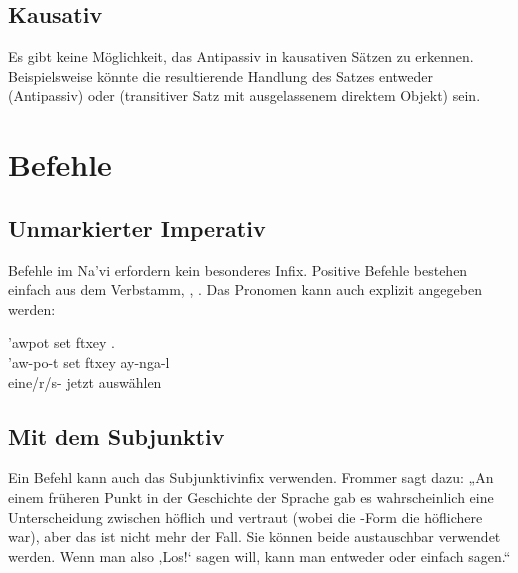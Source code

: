 \subsection{Kausativ} Es gibt keine Möglichkeit, das Antipassiv in kausativen Sätzen zu erkennen. Beispielsweise könnte die resultierende Handlung des Satzes   entweder   (Antipassiv) oder   (transitiver Satz mit ausgelassenem direktem Objekt) sein.

\section{Befehle}
\subsection{Unmarkierter Imperativ} Befehle im Na'vi erfordern kein besonderes Infix. Positive Befehle bestehen einfach aus dem Verbstamm,  ,  . Das Pronomen kann auch explizit angegeben werden:

\begin{interlin}
	\glll \Npawl{}'awpot set ftxey . \\
	'aw-po-t set ftxey ay-nga-l \\
	eine/r/s- jetzt auswählen  \\
\end{interlin}

\subsection{Mit dem Subjunktiv} Ein Befehl kann auch das Subjunktivinfix  verwenden. Frommer sagt dazu: „An einem früheren Punkt in der Geschichte der Sprache gab es wahrscheinlich eine Unterscheidung zwischen höflich und vertraut (wobei die -Form die höflichere war), aber das ist nicht mehr der Fall. Sie können beide austauschbar verwendet werden. Wenn man also ,Los!‘ sagen will, kann man entweder  oder einfach  sagen.“ 

